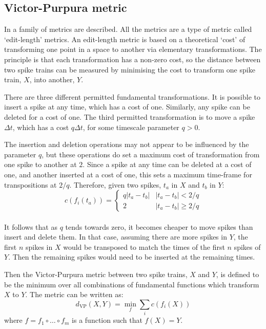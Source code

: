 \subsection{Victor-Purpura metric}

In \citep{VictorPurpura1997a} a family of metrics are described.  All the metrics are a type of metric called \lq{}edit-length\rq{} metrics. An edit-length metric is based on a theoretical \lq{}cost\rq{} of transforming one point in a space to another via elementary transformations.  The principle is that each transformation has a non-zero cost, so the distance between two spike trains can be measured by minimising  the cost to transform one spike train, $X$, into another, $Y$.

There are three different permitted fundamental transformations.  It is possible to insert a spike at any time, which has a cost of one.  Similarly, any spike can be deleted for a cost of one.  The third permitted transformation is to move a spike $\Delta t$, which has a cost $q\Delta t$, for some timescale parameter $q>0$.

The insertion and deletion operations may not appear to be influenced by the parameter $q$, but these operations do set a maximum cost of transformation from one spike to another at $2$.  Since a spike at any time can be deleted at a cost of one, and another inserted at a cost of one, this sets a maximum time-frame for transpositions at $2/q$.  Therefore, given two spikes, $t_a$ in $X$ and $t_b$ in $Y$:
\begin{equation}
c(f_i(t_a)) = \left\{ \begin{array}{ll} q | t_a - t_b | & | t_a - t_b | < 2/q \\ 2 & | t_a - t_b | \geq  2/q \end{array}\right.
\end{equation}\\
It follows that as $q$ tends towards zero, it becomes cheaper to move spikes than insert and delete them.  In that case, assuming there are more spikes in $Y$, the first $n$ spikes in $X$ would be transposed to match the times of the first $n$ spikes of $Y$.  Then the remaining spikes would need to be inserted at the remaining times.

Then the Victor-Purpura metric between two spike trains, $X$ and $Y$, is defined to be the minimum over all combinations of fundamental functions which transform $X$ to $Y$.  The metric can be written as:
\begin{equation}
d_{\text{VP}}(X,Y) = \min_f \sum_i c\left( f_i(X) \right)
\end{equation}
where $f=f_1\circ\ldots\circ f_m$ is a function such that $f(X) = Y$.

